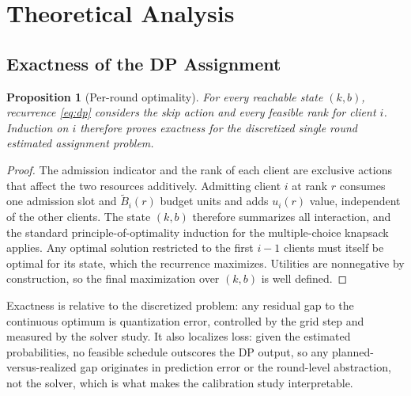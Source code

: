 \documentclass[a4paper,fleqn]{cas-dc}
\newtheorem{proposition}{Proposition}
\begin{document}
\section{Theoretical Analysis}
\label{sec:theory}
\par
\subsection{Exactness of the DP Assignment}
\begin{proposition}[Per-round optimality]
\label{prop:dp}
For every reachable state $(k,b)$, recurrence \cref{eq:dp} considers the skip action and every feasible rank for client $i$. Induction on $i$ therefore proves exactness for the discretized single round estimated assignment problem.
\end{proposition}
\begin{proof}
The admission indicator and the rank of each client are exclusive actions that affect the two resources additively. Admitting client $i$ at rank $r$ consumes one admission slot and $\widetilde B_i(r)$ budget units and adds $u_i(r)$ value, independent of the other clients. The state $(k,b)$ therefore summarizes all interaction, and the standard principle-of-optimality induction for the multiple-choice knapsack applies. Any optimal solution restricted to the first $i-1$ clients must itself be optimal for its state, which the recurrence maximizes. Utilities are nonnegative by construction, so the final maximization over $(k,b)$ is well defined.
\end{proof}
Exactness is relative to the discretized problem: any residual gap to the continuous optimum is quantization error, controlled by the grid step and measured by the solver study. It also localizes loss: given the estimated probabilities, no feasible schedule outscores the DP output, so any planned-versus-realized gap originates in prediction error or the round-level abstraction, not the solver, which is what makes the calibration study interpretable.
\par
\end{document}
